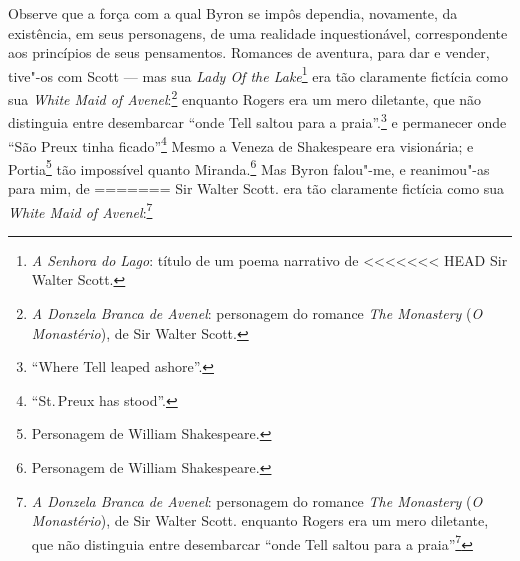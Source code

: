 {{{{{{{{{{{{{{{{{{{{{{{{{{{{{{{{{{{{{{{{{{{{{{{{{{{{{{{{{{{Observe que a força com a qual Byron se impôs dependia, novamente, da
existência, em seus personagens, de uma realidade inquestionável,
correspondente aos princípios de seus pensamentos. Romances de aventura,
para dar e vender, tive"-os com Scott --- mas sua \textit{Lady Of the
Lake}\footnote{\textit{A Senhora do Lago}: título de um poema narrativo de
<<<<<<< HEAD
  Sir Walter Scott.} era tão claramente fictícia como sua
\textit{White Maid of Avenel}:\footnote{\textit{A Donzela Branca de Avenel}:
  personagem do romance \textit{The Monastery} (\textit{O Monastério}), de
  Sir Walter Scott.} enquanto Rogers era um mero
diletante, que não distinguia entre desembarcar ``onde Tell saltou para
a praia''.\footnote{``Where Tell leaped ashore''.} e
permanecer onde ``São Preux tinha ficado''\footnote{``St.\,Preux has
  stood''.} Mesmo a Veneza de Shakespeare era visionária;
e Portia\footnote{Personagem de William Shakespeare.} tão
impossível quanto Miranda.\footnote{Personagem de William Shakespeare.} Mas Byron falou"-me, e reanimou"-as para mim, de
=======
  Sir Walter Scott.  era tão claramente fictícia como sua
\textit{White Maid of Avenel}:\footnote{\textit{A Donzela Branca de Avenel}:
  personagem do romance \textit{The Monastery} (\textit{O Monastério}), de
  Sir Walter Scott.  enquanto Rogers era um mero
diletante, que não distinguia entre desembarcar ``onde Tell saltou para
a praia''\footnote{``Where Tell leaped ashore''.  e
permanecer onde ``São Preux tinha ficado''\footnote{``St.\,Preux has
  stood'' . Mesmo a Veneza de Shakespeare era visionária;
e Portia\footnote{Personagem de William Shakespeare  tão
impossível quanto Miranda.\footnote{Personagem de William Shakespeare
   Mas Byron falou"-me, e reanimou"-as para mim, de
>>>>>>> 7ef31cc2a6d5603f856fee4c85bc83700040648c
pessoas reais cujos pés marcaram o mármore sobre qual ando.

Uma única palavra, embora se refira a um tema futuro, devo"-me
permitir sobre o ritmo de Byron. Seu fluir natural, numa simplicidade e
tranquilidade quase prosaicas, interessou"-me com a mesma intensidade,
com a qual, embora por razões opostas, admirei as construções
logicamente simétricas de Pope e as estrofes equilibradas do verso
clássico e do verso hebreu. Mas, embora eu seguisse naturalmente o
estilo byroniano nos versos que escrevia para meu próprio deleite, meu
respeito pelo aspecto estrutural, em oposição à fluência, por força da
métrica clássica, fundamentado, parcialmente no desdém de Byron pelo seu
próprio trabalho, e parcialmente em meu próprio instinto arquitetônico
para ``o princípio da pirâmide'', fez com que me empenhasse, durante a
formação de meu estilo em prosa, em manter as cadências de Pope e
Johnson em qualquer trabalho sério que escrevesse. Sobre a influência de
Johnson, falarei no último capítulo deste volume; neste ínterim, devo
voltar àqueles dias em que o cantar era apenas o do arroio, em minha
pobre vida de plantinha à beira da água.

}}}}}}}}}}}}}}}}}}}}}}}}}}}}}}}}}}}}}}}}}}}}}}}}}}}}}}}}}}}}}}}}
